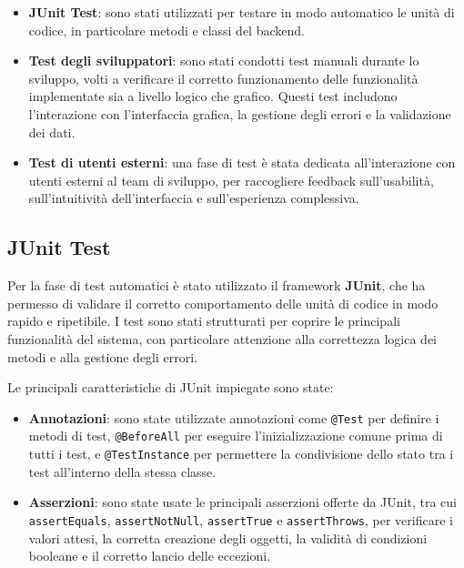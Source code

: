 \documentclass[a4paper]{article}
\begin{document}
\begin{itemize}
    \item \textbf{JUnit Test}: sono stati utilizzati per testare in modo automatico le unità di codice, in particolare metodi e classi del backend.

    \item \textbf{Test degli sviluppatori}: sono stati condotti test manuali durante lo sviluppo, volti a verificare il corretto funzionamento delle funzionalità implementate sia a livello logico che grafico. Questi test includono l’interazione con l’interfaccia grafica, la gestione degli errori e la validazione dei dati.

    \item \textbf{Test di utenti esterni}: una fase di test è stata dedicata all’interazione con utenti esterni al team di sviluppo, per raccogliere feedback sull’usabilità, sull’intuitività dell’interfaccia e sull’esperienza complessiva.
\end{itemize}


\subsection{JUnit Test}
Per la fase di test automatici è stato utilizzato il framework \textbf{JUnit}, che ha permesso di validare il corretto comportamento delle unità di codice in modo rapido e ripetibile. I test sono stati strutturati per coprire le principali funzionalità del sistema, con particolare attenzione alla correttezza logica dei metodi e alla gestione degli errori.

Le principali caratteristiche di JUnit impiegate sono state:

\begin{itemize}
    \item \textbf{Annotazioni}: sono state utilizzate annotazioni come \texttt{@Test} per definire i metodi di test, \texttt{@BeforeAll} per eseguire l'inizializzazione comune prima di tutti i test, e \texttt{@TestInstance} per permettere la condivisione dello stato tra i test all'interno della stessa classe.

    \item \textbf{Asserzioni}: sono state usate le principali asserzioni offerte da JUnit, tra cui \texttt{assertEquals}, \texttt{assertNotNull}, \texttt{assertTrue} e \texttt{assertThrows}, per verificare i valori attesi, la corretta creazione degli oggetti, la validità di condizioni booleane e il corretto lancio delle eccezioni.
\end{itemize}
\end{document}
